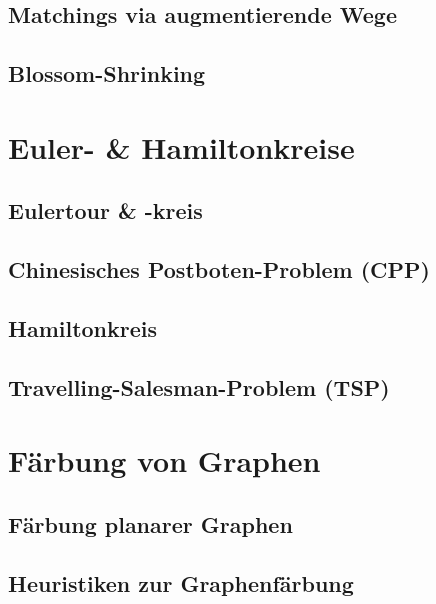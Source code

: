 \documentclass[10pt,a4paper,landscape]{article}
\begin{document}
\begin{multicols*}{2}
    \subsection{ Matchings via augmentierende Wege }

    \subsection{ Blossom-Shrinking }


\section{ Euler- \& Hamiltonkreise }
    \subsection{ Eulertour \& -kreis}

    \subsection{ Chinesisches Postboten-Problem (CPP) }

    \subsection{ Hamiltonkreis }

    \subsection{ Travelling-Salesman-Problem (TSP) }


\section{ Färbung von Graphen }
    \subsection{ Färbung planarer Graphen }

    \subsection{ Heuristiken zur Graphenfärbung }


\end{multicols*}
\end{document}
